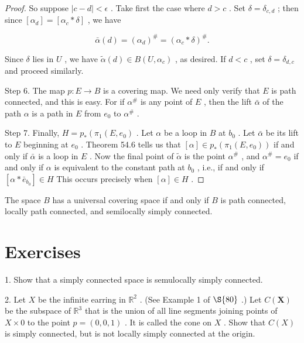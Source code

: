\begin{proof}
So suppose \(\left| {c - d}\right|  < \epsilon\) . Take first the case where \(d > c\) . Set \(\delta  = {\delta }_{c,d}\) ; then since \(\left\lbrack  {\alpha }_{d}\right\rbrack = \left\lbrack  {{\alpha }_{c} * \delta }\right\rbrack\) , we have

\[
\bar{\alpha }\left( d\right)  = {\left( {\alpha }_{d}\right) }^{\# } = {\left( {\alpha }_{c} * \delta \right) }^{\# }.
\]

Since \(\delta\) lies in \(U\) , we have \(\widetilde{\alpha }\left( d\right)  \in  B\left( {U,{\alpha }_{c}}\right)\) , as desired. If \(d < c\) , set \(\delta  = {\delta }_{d,c}\) and proceed similarly.

Step 6. The map \(p : E \rightarrow  B\) is a covering map. We need only verify that \(E\) is path connected, and this is easy. For if \({\alpha }^{\# }\) is any point of \(E\) , then the lift \(\bar{\alpha }\) of the path \(\alpha\) is a path in \(E\) from \({e}_{0}\) to \({\alpha }^{\# }\) .

Step 7. Finally, \(H = {p}_{ * }\left( {{\pi }_{1}\left( {E,{e}_{0}}\right) }\right.\) . Let \(\alpha\) be a loop in \(B\) at \({b}_{0}\) . Let \(\bar{\alpha }\) be its lift to \(E\) beginning at \({e}_{0}\) . Theorem 54.6 tells us that \(\left\lbrack  \alpha \right\rbrack \in  {p}_{ * }\left( {{\pi }_{1}\left( {E,{e}_{0}}\right) }\right)\) if and only if \(\bar{\alpha }\) is a loop in \(E\) . Now the final point of \(\widetilde{\alpha }\) is the point \({\alpha }^{\# }\) , and \({\alpha }^{\# } = {e}_{0}\) if and only if \(\alpha\) is equivalent to the constant path at \({b}_{0}\) , i.e., if and only if \(\left\lbrack  {\alpha  * {\bar{e}}_{{b}_{0}}}\right\rbrack \in  H\) This occurs precisely when \(\left\lbrack  \alpha \right\rbrack \in  H\) .
\end{proof}
\begin{corollary} The space \(B\) has a universal covering space if and only if \(B\) is path connected, locally path connected, and semilocally simply connected.
\end{corollary}

\section*{Exercises}

1. Show that a simply connected space is semulocally simply connected.

2. Let \(X\) be the infinite earring in \({\mathbb{R}}^{2}\) . (See Example 1 of \( \S {80}\) .) Let \(C\left( \mathbf{X}\right)\) be the subspace of \({\mathbb{R}}^{3}\) that is the union of all line segments joining points of \(X \times  0\) to the point \(p = \left( {0,0,1}\right)\) . It is called the cone on \(X\) . Show that \(C\left( X\right)\) is simply connected, but is not locally simply connected at the origin.

